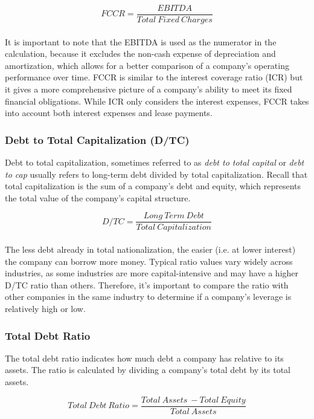 \documentclass{article}
\begin{document}
 \begin{equation}
    FCCR = \frac{EBITDA}{Total\: Fixed\: Charges}
\end{equation}\\

It is important to note that the EBITDA is used as the numerator in the calculation, because it excludes the non-cash expense of depreciation and amortization, which allows for a better comparison of a company's operating performance over time. FCCR is similar to the interest coverage ratio (ICR) but it gives a more comprehensive picture of a company's ability to meet its fixed financial obligations. While ICR only considers the interest expenses, FCCR takes into account both interest expenses and lease payments.


\subsubsection{Debt to Total Capitalization (D/TC)}
Debt to total capitalization, sometimes referred to as \textit{debt to total capital} or \textit{debt to cap} usually refers to long-term debt divided by total capitalization. Recall that total capitalization is the sum of a company's debt and equity, which represents the total value of the company's capital structure.

 \begin{equation}
    D/TC = \frac{Long\: Term\: Debt}{Total\: Capitalization}
\end{equation}\\

The less debt already in total nationalization, the easier (i.e. at lower interest) the company can borrow more money. Typical ratio values vary widely across industries, as some industries are more capital-intensive and may have a higher D/TC ratio than others. Therefore, it's important to compare the ratio with other companies in the same industry to determine if a company's leverage is relatively high or low.

\subsubsection{Total Debt Ratio}
The total debt ratio indicates how much debt a company has relative to its assets. The ratio is calculated by dividing a company's total debt by its total assets. 

 \begin{equation}
    Total\: Debt\: Ratio = \frac{Total\: Assets\: - Total\: Equity}{Total\: Assets}
\end{equation}\\
\end{document}
